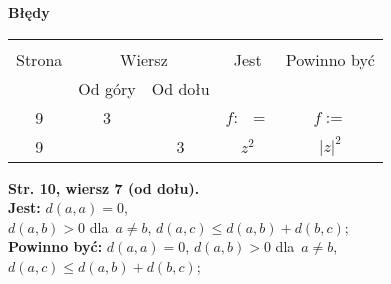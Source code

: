 \documentclass[a4paper,11pt]{article}
\newcommand{\tb}{\textbf}
\newcommand{\StrWd}[2]{\tb{Str. #1, wiersz #2 (od dołu).}}
\newcommand{\Center}[1]{\begin{center} #1 \end{center}}
\newcommand{\CenterTB}[1]{\Center{\tb{#1}}}
\newcommand{\Jest}{\tb{Jest: }}
\newcommand{\Pow}{\tb{Powinno być: }}
\providecommand{\abso}[1]{\lvert #1 \rvert}
\begin{document}
\CenterTB{Błędy}
\begin{center}
  \begin{tabular}{|c|c|c|c|c|}
    \hline
    & \multicolumn{2}{c|}{} & & \\
    Strona & \multicolumn{2}{c|}{Wiersz} & Jest
                              & Powinno być \\ \cline{2-3}
    & Od góry & Od dołu & & \\
    \hline
    9 & 3 & & $f\!:\;\: =$ & $f :=$ \\
    9 & & 3 & $z^{ 2 }$ & $\abso{ z }^{ 2 }$ \\
    \hline
  \end{tabular}
\end{center}
\StrWd{10}{7} \\
\Jest $d( a, a ) = 0$, \\
$d( a,b ) > 0$ dla~$a \neq b$, $d( a, c ) \leq d( a, b ) + d( b,c )$; \\
\Pow $d( a, a ) = 0$, $d( a,b ) > 0$ dla~$a \neq b$,
$d( a, c ) \leq d( a, b ) + d( b,c )$; \\





 {}




\end{document}
